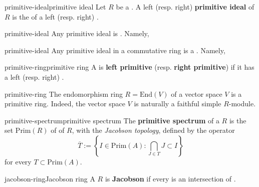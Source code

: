 \begin{topic}{primitive-ideal}{primitive ideal}
    Let $R$ be a . A left (resp. right) \textbf{primitive ideal} of $R$ is the  of a  left (resp. right) .
\end{topic}

\begin{example}{primitive-ideal}
    Any primitive ideal is . Namely, 
\end{example}

\begin{example}{primitive-ideal}
    Any primitive ideal in a commutative ring is a . Namely, 
\end{example}

\begin{topic}{primitive-ring}{primitive ring}
    A  is \textbf{left primitive} (resp. \textbf{right primitive}) if it has a   left (resp. right) .
\end{topic}

\begin{example}{primitive-ring}
    The endomorphism ring $R = \text{End}(V)$ of a vector space $V$ is a primitive ring. Indeed, the vector space $V$ is naturally a faithful simple $R$-module.
\end{example}

\begin{topic}{primitive-spectrum}{primitive spectrum}
    The \textbf{primitive spectrum} of a  $R$ is the set $\text{Prim}(R)$ of  of $R$, with the \textit{Jacobson topology}, defined by the  operator
    \[ \overline{T} := \left\{ I \in \text{Prim}(A) : \bigcap_{J \in T} J \subset I \right\} \]
    for every $T \subset \text{Prim}(A)$.
\end{topic}

\begin{topic}{jacobson-ring}{Jacobson ring}
    A  $R$ is \textbf{Jacobson} if every  is an intersection of .
\end{topic}
